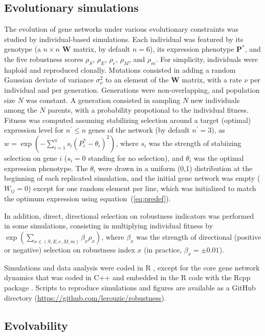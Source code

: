 \documentclass[10pt,a4paper]{article}
\newcommand{\stability}{{\rho_S}}
\newcommand{\earlyenv}{{\rho_E}}
\newcommand{\lateenv}{{\rho_e}}
\newcommand{\earlymut}{{\rho_M}}
\newcommand{\latemut}{{\rho_m}}
\begin{document}
\subsection{Evolutionary simulations}

The evolution of gene networks under various evolutionary constraints was studied by individual-based simulations. Each individual was featured by its genotype (a $n \times n$ $\bm W$ matrix, by default $n=6$), its expression phenotype $\bm P^*$, and the five robustness scores $\stability$, $\earlyenv$, $\lateenv$, $\earlymut$, and $\latemut$. For simplicity, individuals were haploid and reproduced clonally. Mutations consisted in adding a random Gaussian deviate of variance $\sigma_\nu^2$ to an element of the $\bm W$ matrix, with a rate $\nu$ per individual and per generation. Generations were non-overlapping, and population size $N$ was constant. A generation consisted in sampling $N$ new individuals among the $N$ parents, with a probability propotional to the individual fitness. Fitness was computed assuming stabilizing selection around a target (optimal) expression level for $n^\prime \leq n$ genes of the network (by default $n^\prime=3$), as $w = \exp(- \sum_{i=1}^{n^\prime} s_i (P_i^* - \theta_i)^2 )$, where $s_i$ was the strength of stabiizing selection on gene $i$ ($s_i = 0$ standing for no selection), and $\theta_i$ was the optimal expression phenotype. The $\theta_i$ were drawn in a uniform (0,1) distribution at the beginning of each replicated simulation, and the initial gene network was empty ($W_{ij} = 0$) except for one random element per line, which was initialized to match the optimum expression using equation~(\ref{eq:predef}). 

In addition, direct, directional selection on robustness indicators was performed in some simulations, consisting in multiplying individual fitness by $\exp ( \sum_{x \in (S, E, e, M, m)} \beta_x \rho _x )$, where $\beta_x$ was the strength of directional (positive or negative) selection on robustness index $x$ (in practice, $\beta_x= \pm 0.01$). 

Simulations and data analysis were coded in R \citep{R20}, except for the core gene network dynamics that was coded in C++ and embedded in the R code with the Rcpp package \citep{EF11}. Scripts to reproduce simulations and figures are available as a GitHub directory (\url{https://github.com/lerouzic/robustness}). 

\subsection{Evolvability}
\end{document}
